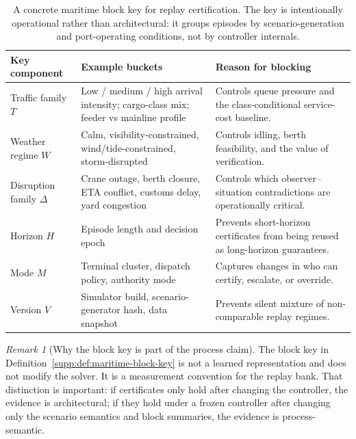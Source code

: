 \documentclass[11pt]{article}
\newcommand{\1}{\mathbf{1}}
\theoremstyle{definition}
\theoremstyle{plain}
\theoremstyle{remark}
\newtheorem{remark}[definition]{Remark}
\begin{document}
\begin{table}[t]
\centering
\small
\begin{tabularx}{\textwidth}{@{}p{}X X@{}}
\toprule
\textbf{Key component} & \textbf{Example buckets} & \textbf{Reason for blocking} \\
\midrule
Traffic family $T$ & Low / medium / high arrival intensity; cargo-class mix; feeder vs mainline profile & Controls queue pressure and the class-conditional service-cost baseline. \\
Weather regime $W$ & Calm, visibility-constrained, wind/tide-constrained, storm-disrupted & Controls idling, berth feasibility, and the value of verification. \\
Disruption family $\Delta$ & Crane outage, berth closure, ETA conflict, customs delay, yard congestion & Controls which observer--situation contradictions are operationally critical. \\
Horizon $H$ & Episode length and decision epoch & Prevents short-horizon certificates from being reused as long-horizon guarantees. \\
Mode $M$ & Terminal cluster, dispatch policy, authority mode & Captures changes in who can certify, escalate, or override. \\
Version $V$ & Simulator build, scenario-generator hash, data snapshot & Prevents silent mixture of non-comparable replay regimes. \\
\bottomrule
\end{tabularx}
\caption{A concrete maritime block key for replay certification. The key is intentionally operational rather than architectural: it groups episodes by scenario-generation and port-operating conditions, not by controller internals.}
\label{supp:tab:maritime-block-key}
\end{table}

\begin{remark}[Why the block key is part of the process claim]
\label{supp:rem:block-key-not-controller}
The block key in Definition~\ref{supp:def:maritime-block-key} is not a learned representation and does not modify the solver. It is a measurement convention for the replay bank. That distinction is important: if certificates only hold after changing the controller, the evidence is architectural; if they hold under a frozen controller after changing only the scenario semantics and block summaries, the evidence is process-semantic.
\end{remark}
\end{document}
